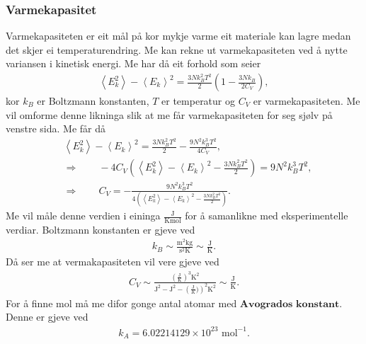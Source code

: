 \documentclass[12pt, a4paper]{article}
\theoremstyle{definition} \newtheorem*{definition}{Teorem}
\newcommand{\lla}{\left \langle}
\newcommand{\rra}{\right \rangle}
\begin{document}
        \subsubsection*{Varmekapasitet}
            Varmekapasiteten er eit mål på kor mykje varme eit materiale kan lagre medan det skjer ei temperaturendring. Me kan rekne ut varmekapasiteten ved å nytte variansen 
            i kinetisk energi. Me har då eit forhold som seier
            \begin{align*}
                \lla E_k^2 \rra - \lla E_k \rra^2 = \frac{3Nk_B^2T^2}{2}\left( 1 - \frac{3Nk_B}{2C_V} \right),
            \end{align*}
            kor $k_B$ er Boltzmann konstanten, $T$ er temperatur og $C_V$ er varmekapasiteten. Me vil omforme denne likninga slik at me får varmekapasiteten for seg sjølv på 
            venstre sida. Me får då
            \begin{align*}
                &\lla E_k^2 \rra - \lla E_k \rra^2 = \frac{3Nk_B^2T^2}{2} - \frac{9N^2k_B^3T^2}{4C_V}, \\
                &\Rightarrow \qquad -4C_V\left( \lla E_k^2 \rra - \lla E_k \rra^2 -\frac{3Nk_B^2T^2}{2}\right) = 9N^2k_B^3T^2, \\
                &\Rightarrow \qquad C_V = -\frac{9N^2k_B^3T^2}{4\left( \lla E_k^2 \rra - \lla E_k \rra^2 -\frac{3Nk_B^2T^2}{2}\right)}.
            \end{align*}
            Me vil måle denne verdien i eininga $\frac{\text{J}}{\text{Kmol}}$ for å samanlikne med eksperimentelle verdiar. Boltzmann konstanten er gjeve ved
            \begin{align*}
                k_B \sim \frac{\text{m}^2\text{kg}}{\text{s}^2\text{K}} \sim \frac{\text{J}}{\text{K}}.
            \end{align*}
            Då ser me at vermakapasiteten vil vere gjeve ved
            \begin{align*}
                C_V \sim \frac{\left( \frac{\text{J}}{\text{K}} \right)^3\text{K}^2}{\text{J}^2 - \text{J}^2 - \left(\frac{\text{J}}{K})\right)^2\text{K}^2} 
                \sim \frac{\text{J}}{\text{K}}.
            \end{align*}
            For å finne mol må me difor gonge antal atomar med $\textbf{Avogrados konstant}$.
            Denne er gjeve ved
            \begin{align*}
                k_A = 6.02214129\times10^{23}\text{ mol}^{-1}.
            \end{align*}
\end{document}
